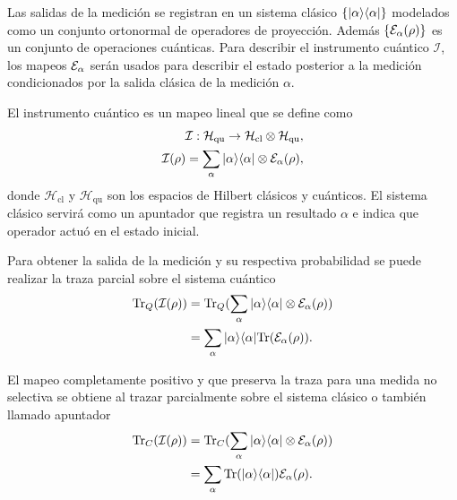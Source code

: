 Las salidas de la medición se registran en un sistema clásico $\{|\alpha\rangle \langle
\alpha |\}$ modelados como un conjunto ortonormal de operadores de proyección.
Además $\{\mathcal{E}_\alpha(\rho)\}$ es un conjunto de operaciones cuánticas. Para
describir el instrumento cuántico $\mathcal{I}$, los mapeos $\mathcal{E}_\alpha$ serán
usados para describir  el estado posterior a la medición condicionados por la
salida clásica de la medición $\alpha$. 



El instrumento cuántico es un mapeo lineal que se define como
\begin{equation}
    \begin{split}
        \mathcal{I}: \mathcal{H}_{\text{qu}}\rightarrow\mathcal{H}_{\text{cl}}\otimes \mathcal{H}_{\text{qu}},\\
    \mathcal{I}(\rho)=\sum_\alpha |\alpha\rangle \langle\alpha|\otimes \mathcal{E}_\alpha(\rho),
    \end{split}
\end{equation}
donde $\mathcal{H}_{\text{cl}}$ y $\mathcal{H}_{\text{qu}}$ son los espacios de Hilbert clásicos y cuánticos. El sistema clásico servirá como un apuntador que registra un resultado
$\alpha$ e indica que operador actuó en el estado inicial.



Para obtener la salida de la medición y su respectiva probabilidad se puede
realizar la traza parcial sobre el sistema cuántico \begin{equation}
    \begin{split}
        {\rm Tr}_Q(\mathcal{I}(\rho))&={\rm Tr}_Q(\sum_\alpha |\alpha\rangle \langle\alpha|\otimes \mathcal{E}_\alpha(\rho))\\
        &=\sum_\alpha |\alpha\rangle \langle\alpha|{\rm Tr}(\mathcal{E}_\alpha(\rho)).
    \end{split}
\end{equation}

El mapeo completamente positivo y que preserva la traza para una medida no selectiva se obtiene al trazar parcialmente sobre el sistema clásico o también llamado apuntador\begin{equation}
    \begin{split}
        {\rm Tr}_C(\mathcal{I}(\rho))&={\rm Tr}_C(\sum_\alpha |\alpha\rangle \langle\alpha|\otimes \mathcal{E}_\alpha(\rho))\\
        &=\sum_\alpha {\rm Tr}(|\alpha\rangle \langle\alpha|)\mathcal{E}_\alpha(\rho).
    \end{split}
\end{equation}

